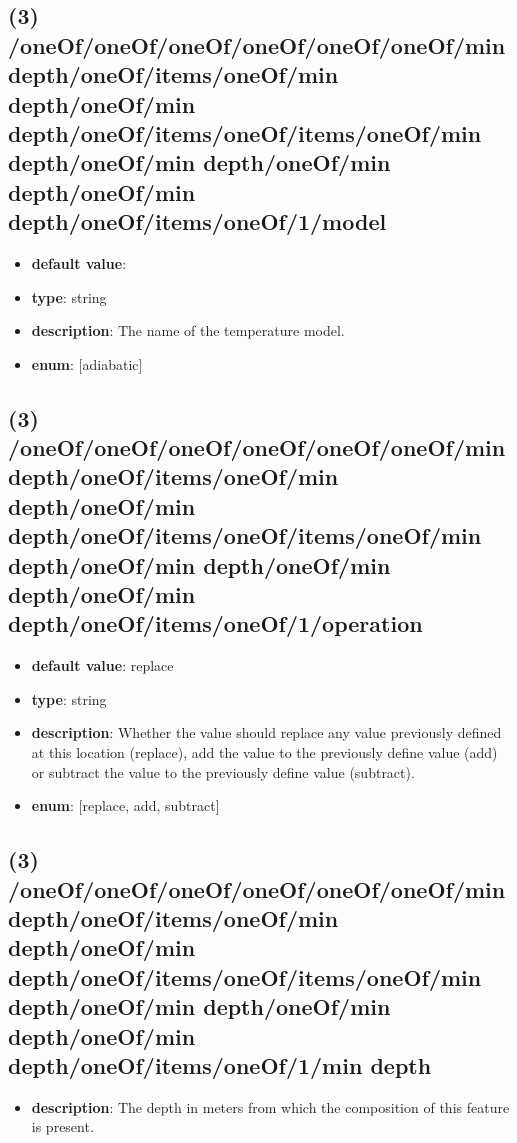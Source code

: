 \subsection{(3) /oneOf/oneOf/oneOf/oneOf/oneOf/oneOf/min depth/oneOf/items/oneOf/min depth/oneOf/min depth/oneOf/items/oneOf/items/oneOf/min depth/oneOf/min depth/oneOf/min depth/oneOf/min depth/oneOf/items/oneOf/1/model}
\begin{itemize}[leftmargin=3em]\item {\bf default value}: 
\item {\bf type}: string
\item {\bf description}: The name of the temperature model.
\item {\bf enum}: [adiabatic]\end{itemize}\subsection{(3) /oneOf/oneOf/oneOf/oneOf/oneOf/oneOf/min depth/oneOf/items/oneOf/min depth/oneOf/min depth/oneOf/items/oneOf/items/oneOf/min depth/oneOf/min depth/oneOf/min depth/oneOf/min depth/oneOf/items/oneOf/1/operation}
\begin{itemize}[leftmargin=3em]\item {\bf default value}: replace
\item {\bf type}: string
\item {\bf description}: Whether the value should replace any value previously defined at this location (replace), add the value to the previously define value (add) or subtract the value to the previously define value (subtract).
\item {\bf enum}: [replace, add, subtract]\end{itemize}\subsection{(3) /oneOf/oneOf/oneOf/oneOf/oneOf/oneOf/min depth/oneOf/items/oneOf/min depth/oneOf/min depth/oneOf/items/oneOf/items/oneOf/min depth/oneOf/min depth/oneOf/min depth/oneOf/min depth/oneOf/items/oneOf/1/min depth}
\begin{itemize}[leftmargin=3em]\item {\bf description}: The depth in meters from which the composition of this feature is present.
\end{itemize}
